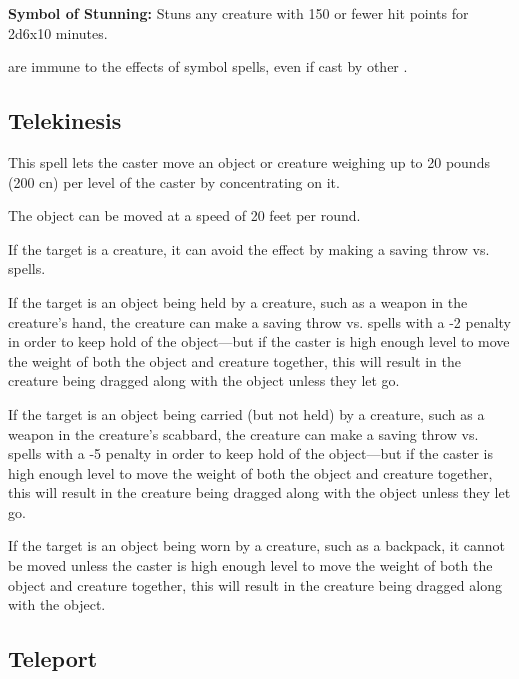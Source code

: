 \begin{multicols*}{2}
\textbf{Symbol of Stunning:} Stuns any creature with 150 or fewer hit points for 2d6x10 minutes.

 are immune to the effects of symbol spells, even if cast by other .

\subsection{Telekinesis}\label{spell:Telekinesis}

This spell lets the caster move an object or creature weighing up to 20 pounds (200 cn) per level of the caster by concentrating on it.

The object can be moved at a speed of 20 feet per round.

If the target is a creature, it can avoid the effect by making a saving throw vs. spells.

If the target is an object being held by a creature, such as a weapon in the creature’s hand, the creature can make a saving throw vs. spells with a -2 penalty in order to keep hold of the object—but if the caster is high enough level to move the weight of both the object and creature together, this will result in the creature being dragged along with the object unless they let go.

If the target is an object being carried (but not held) by a creature, such as a weapon in the creature’s scabbard, the creature can make a saving throw vs. spells with a -5 penalty in order to keep hold of the object—but if the caster is high enough level to move the weight of both the object and creature together, this will result in the creature being dragged along with the object unless they let go.

If the target is an object being worn by a creature, such as a backpack, it cannot be moved unless the caster is high enough level to move the weight of both the object and creature together, this will result in the creature being dragged along with the object.

\subsection{Teleport}\label{spell:Teleport}
\end{multicols*}
